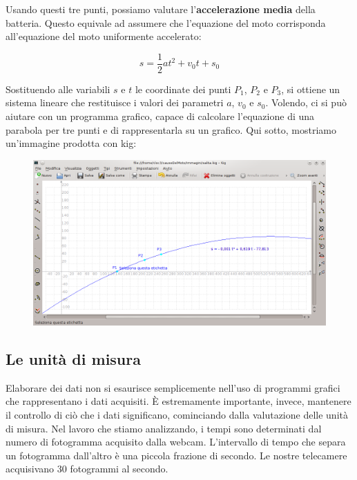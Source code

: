 Usando questi tre punti, possiamo valutare l'{\bf accelerazione media} della batteria.\newline
Questo equivale ad assumere che l'equazione del moto corrisponda all'equazione del moto uniformente accelerato:
\begin{center}
  \begin{equation}
  	s = \frac{1}{2} a t^2 + v_0 t + s_0
  \end{equation}
\end{center}

Sostituendo alle variabili $s$ e $t$ le coordinate dei punti $P_1$, $P_2$ e $P_3$, si ottiene un sistema lineare che restituisce i valori dei parametri $a$, $v_0$ e $s_0$.\newline
Volendo, ci si può aiutare con un programma grafico, capace di calcolare l'equazione di una parabola per tre punti e di rappresentarla su un grafico. Qui sotto, mostriamo un'immagine prodotta con kig:

\begin{figure}[H]
 \centering
 \includegraphics[width=.7\textwidth]{../immagini/salitaConKig.png}
 \label{fig:parabolaPerTrePunti}
\end{figure}

\subsection{Le unità di misura}

Elaborare dei dati non si esaurisce semplicemente nell'uso di programmi grafici che rappresentano i dati acquisiti. È estremamente importante, invece, mantenere il controllo di ciò che i dati significano, cominciando dalla valutazione delle unità di misura. Nel lavoro che stiamo analizzando, i tempi sono determinati dal numero di fotogramma acquisito dalla webcam. L'intervallo di tempo che separa un fotogramma dall'altro è una piccola frazione di secondo.\newline
Le nostre telecamere acquisivano 30 fotogrammi al secondo.\newline

